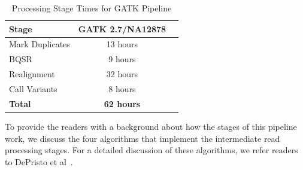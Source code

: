 \documentclass[10pt,twocolumn]{article}
\theoremstyle{plain}
\begin{document}
\begin{table}[h]
\caption{Processing Stage Times for GATK Pipeline}
\label{tab:stage-time}
\begin{center}
\begin{tabular}{| l | c | c |}
\hline
\bf Stage & \bf GATK 2.7/NA12878 \\
\hline
Mark Duplicates & 13 hours\\
BQSR & 9 hours\\
Realignment & 32 hours\\
Call Variants & 8 hours\\ \hline
\bf Total & \bf 62 hours\\ %
\hline
\end{tabular}
\end{center}
\end{table}

To provide the readers with a background about how the stages of this pipeline work, we discuss the four algorithms that
implement the intermediate read processing stages. For a detailed discussion of these algorithms, we refer readers to DePristo
et al~\cite{depristo11}.
\end{document}
